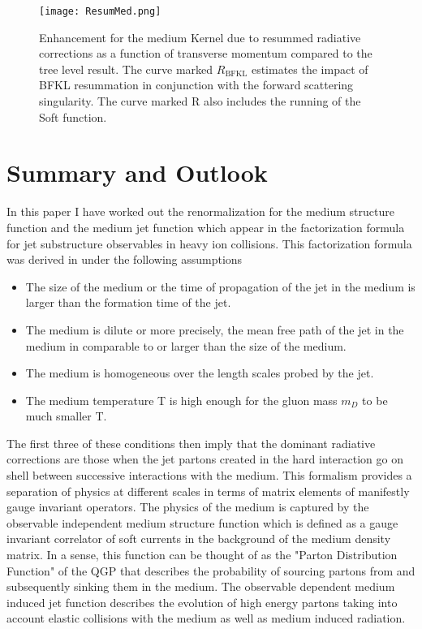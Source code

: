\documentclass[letter,11pt]{article}
\begin{document}
\begin{figure}
\centering
  \texttt{[image: ResumMed.png]}
  \caption{Enhancement for the medium Kernel due to resummed radiative corrections as a function of transverse momentum compared to the tree level result. The curve marked $R_{\text{BFKL}}$ estimates the impact of BFKL resummation in conjunction with the forward scattering singularity. The curve marked R also includes the running of the Soft function.}
  \label{RMed}
\end{figure}


\section{Summary and Outlook}
\label{sec:Conclusion}

In this paper I have worked out the renormalization for the medium structure function and the medium jet function which appear in the factorization formula for jet substructure observables in heavy ion collisions. This factorization formula was derived in \cite{Vaidya:2020lih} under the following assumptions 
\begin{itemize}
\item{} The size of the medium or the time of propagation of the jet in the medium is larger than the formation time of the jet.
\item{} The medium is dilute or more precisely, the mean free path of the jet in the medium in comparable to or larger than the size of the medium.
\item{} The medium is homogeneous over the length scales probed by the jet.
\item{} The medium temperature T is high enough for the gluon mass $m_D$ to be much smaller T.
\end{itemize}
The first three of these conditions then imply that the dominant radiative corrections are those when the jet partons created in the hard interaction go on shell between successive interactions with the medium. This formalism provides a separation of physics at different scales in terms of matrix elements of manifestly gauge invariant operators. The physics of the medium is captured by the observable independent medium structure function which is defined as a gauge invariant correlator of soft currents in the background of the medium density matrix. In a sense, this function can be thought of as the "Parton Distribution Function" of the QGP that describes the probability of sourcing partons from and subsequently sinking them in the medium. The observable dependent medium induced jet function describes the evolution of high energy partons taking into account elastic collisions with the medium as well as medium induced radiation.
\end{document}
